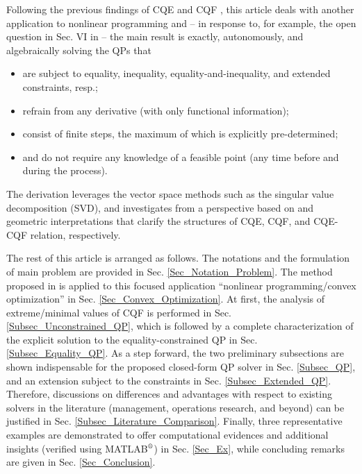\documentclass{imaman}
\numberwithin{equation}{section}
\begin{document}
\newpage Following the previous findings of CQE and CQF \citep{LiLiHs:20}, this article deals with another application to nonlinear programming and -- in response to, for example, the open question in Sec. VI in \cite{DuJoWaWi:15} -- the main result is exactly, autonomously, and algebraically solving the QPs that
\begin{itemize}
\item are subject to equality, inequality, equality-and-inequality, and extended constraints, resp.;
\item refrain from any derivative (with only functional information);
\item consist of finite steps, the maximum of which is explicitly pre-determined;
\item and do not require any knowledge of a feasible point (any time before and during the process).
\end{itemize}
The derivation leverages the vector space methods such as the singular value decomposition (SVD), and investigates from a perspective based on \cite{LiLiHs:20} and geometric interpretations that clarify the structures of CQE, CQF, and CQE-CQF relation, respectively.

The rest of this article is arranged as follows. The notations and the formulation of main problem are provided in Sec. \ref{Sec_Notation_Problem}. The method proposed in \cite{LiLiHs:20} is applied to this focused application ``nonlinear programming/convex optimization'' in Sec. \ref{Sec_Convex_Optimization}. At first, the analysis of extreme/minimal values of CQF is performed in Sec. \ref{Subsec_Unconstrained_QP}, which is followed by a complete characterization of the explicit solution to the equality-constrained QP in Sec. \ref{Subsec_Equality_QP}. As a step forward, the two preliminary subsections are shown indispensable for the proposed closed-form QP solver in Sec. \ref{Subsec_QP}, and an extension subject to the constraints in Sec. \ref{Subsec_Extended_QP}. Therefore, discussions on differences and advantages with respect to existing solvers in the literature (management, operations research, and beyond) can be justified in Sec. \ref{Subsec_Literature_Comparison}. Finally, three representative examples are demonstrated to offer computational evidences and additional insights (verified using MATLAB$\textsuperscript{\textregistered}$) in Sec. \ref{Sec_Ex}, while concluding remarks are given in Sec. \ref{Sec_Conclusion}.
\end{document}
